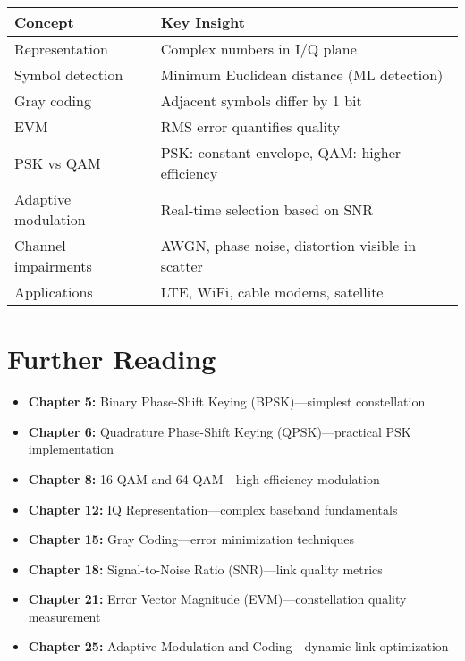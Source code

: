 \begin{center}
\begin{tabular}{@{}ll@{}}
\toprule
\textbf{Concept} & \textbf{Key Insight} \\
\midrule
Representation & Complex numbers in I/Q plane \\
Symbol detection & Minimum Euclidean distance (ML detection) \\
Gray coding & Adjacent symbols differ by 1 bit \\
EVM & RMS error quantifies quality \\
PSK vs QAM & PSK: constant envelope, QAM: higher efficiency \\
Adaptive modulation & Real-time selection based on SNR \\
Channel impairments & AWGN, phase noise, distortion visible in scatter \\
Applications & LTE, WiFi, cable modems, satellite \\
\bottomrule
\end{tabular}
\end{center}

\section{Further Reading}

\begin{itemize}
\item \textbf{Chapter 5:} Binary Phase-Shift Keying (BPSK)---simplest constellation
\item \textbf{Chapter 6:} Quadrature Phase-Shift Keying (QPSK)---practical PSK implementation
\item \textbf{Chapter 8:} 16-QAM and 64-QAM---high-efficiency modulation
\item \textbf{Chapter 12:} IQ Representation---complex baseband fundamentals
\item \textbf{Chapter 15:} Gray Coding---error minimization techniques
\item \textbf{Chapter 18:} Signal-to-Noise Ratio (SNR)---link quality metrics
\item \textbf{Chapter 21:} Error Vector Magnitude (EVM)---constellation quality measurement
\item \textbf{Chapter 25:} Adaptive Modulation and Coding---dynamic link optimization
\end{itemize}
